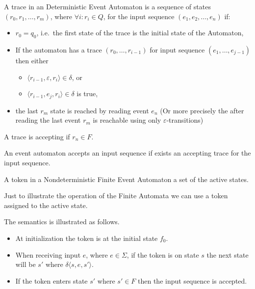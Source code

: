 			\begin{dfn}
				\label{dfn:cep:ea:trace}
				A trace in an Deterministic Event Automaton is
				a sequence of states $(r_0, r_1, \dots, r_m)$, where $\forall i: r_i \in Q$,
				for the input sequence $(e_1, e_2, \dots, e_n)$ if:
				\begin{itemize}
					\item $r_0 = q_0$, i.e.~the first state of the trace is the initial state of the Automaton,
					\item If the automaton has a trace $(r_0,\dots,r_{i-1})$ for input sequence $(e_1,\dots,e_{j-1})$ then either
					\begin{itemize} 
						\item $\langle r_{i-1}, \varepsilon, r_i \rangle \in \delta$, or
						\item  $\langle r_{i-1}, e_j, r_i \rangle \in \delta$ is true,
					\end{itemize}
					\item the last $r_m$ state is reached by reading event $e_n$ (Or more precisely the after reading the last event $r_m$ is reachable using only
					$\varepsilon$-transitions)
				\end{itemize}
				A trace is accepting if $r_n \in F$.
			\end{dfn}
		
			\begin{dfn}
				\label{dfn:cep:ea:accepting}
				An event automaton accepts an input sequence if exists an accepting trace for the input sequence.
			\end{dfn}
		
			\begin{dfn}
				\label{dfn:cep:ea:token}
				A token in a Nondeterministic Finite Event Automaton a set of the active states.
			\end{dfn}
			
			Just to illustrate the operation of the Finite Automata we can use a token assigned to the active state.
	
			The semantics is illustrated as follows. 
			\begin{itemize}
				\item At initialization the token is at the initial state $f_0$.
				\item When receiving input $e$, where $e \in \Sigma$, if the token is on state $s$ the next state will be $s'$ where
				$\delta \langle s,e,s' \rangle$.%
				\item If the token enters state $s'$ where $s' \in F$ then the input sequence is accepted. 			
			\end{itemize}
	
